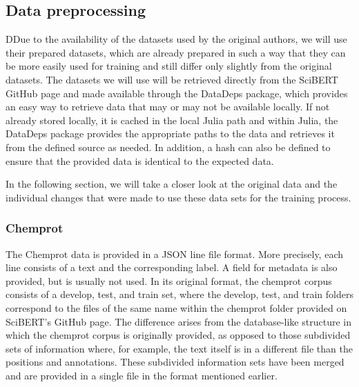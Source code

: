 \color{red}
\subsection{Data preprocessing}
DDue to the availability of the datasets used by the original authors, we will use their prepared datasets, which are already prepared in such a way that they can be more easily used for training and still differ only slightly from the original datasets. The datasets we will use will be retrieved directly from the SciBERT GitHub page and made available through the DataDeps package, which provides an easy way to retrieve data that may or may not be available locally. If not already stored locally, it is cached in the local Julia path and within Julia, the DataDeps package provides the appropriate paths to the data and retrieves it from the defined source as needed. In addition, a hash can also be defined to ensure that the provided data is identical to the expected data.\cite{White2019} 

In the following section, we will take a closer look at the original data and the individual changes that were made to use these data sets for the training process. 

\subsubsection{Chemprot} 

The Chemprot data is provided in a JSON line file format. More precisely, each line consists of a text and the corresponding label. A field for metadata is also provided, but is usually not used. In its original format, the chemprot corpus consists of a develop, test, and train set, where the develop, test, and train folders correspond to the files of the same name within the chemprot folder provided on SciBERT's GitHub page. The difference arises from the database-like structure in which the chemprot corpus is originally provided, as opposed to those subdivided sets of information where, for example, the text itself is in a different file than the positions and annotations. These subdivided information sets have been merged and are provided in a single file in the format mentioned earlier. \cite{Beltagy2019,Wang2016} 

